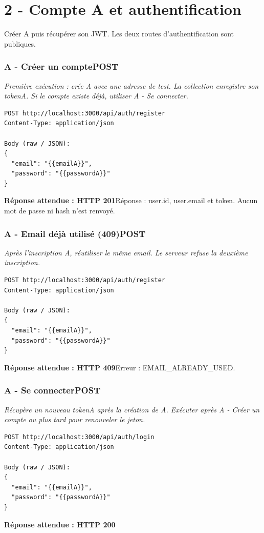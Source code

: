 \documentclass[10pt,a4paper]{article}
\newcommand{\expected}[2]{\par\smallskip\noindent\colorbox{forest!9}{\parbox{\dimexpr\linewidth-2\fboxsep}{\textcolor{forest}{\textbf{Réponse attendue : HTTP #1}}\hspace{0.4em}#2}}\par\medskip}
\newcommand{\reqheading}[3]{\subsubsection*{\textcolor{forest}{#1}\hfill\textcolor{ink}{\small #2}}\textit{#3}\par}
\begin{document}
\section{2 - Compte A et authentification}
Créer A puis récupérer son JWT. Les deux routes d'authentification sont publiques.
\reqheading{A - Créer un compte}{POST}{Première exécution : crée A avec une adresse de test. La collection enregistre son tokenA. Si le compte existe déjà, utiliser A - Se connecter.}
\begin{lstlisting}[style=requestcode]
POST http://localhost:3000/api/auth/register
Content-Type: application/json

Body (raw / JSON):
{
  "email": "{{emailA}}",
  "password": "{{passwordA}}"
}
\end{lstlisting}
\expected{201}{Réponse : user.id, user.email et token. Aucun mot de passe ni hash n'est renvoyé.}
\vspace{0.25em}
\reqheading{A - Email déjà utilisé (409)}{POST}{Après l'inscription A, réutiliser le même email. Le serveur refuse la deuxième inscription.}
\begin{lstlisting}[style=requestcode]
POST http://localhost:3000/api/auth/register
Content-Type: application/json

Body (raw / JSON):
{
  "email": "{{emailA}}",
  "password": "{{passwordA}}"
}
\end{lstlisting}
\expected{409}{Erreur : EMAIL\_ALREADY\_USED.}
\vspace{0.25em}
\reqheading{A - Se connecter}{POST}{Récupère un nouveau tokenA après la création de A. Exécuter après A - Créer un compte ou plus tard pour renouveler le jeton.}
\begin{lstlisting}[style=requestcode]
POST http://localhost:3000/api/auth/login
Content-Type: application/json

Body (raw / JSON):
{
  "email": "{{emailA}}",
  "password": "{{passwordA}}"
}
\end{lstlisting}
\expected{200}{}
\vspace{0.25em}
\newpage
\end{document}
